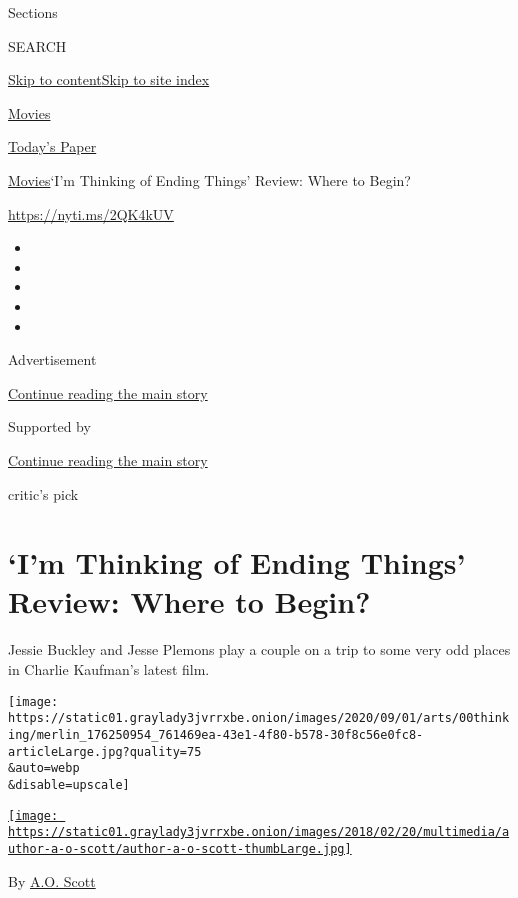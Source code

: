Sections

SEARCH

\protect\hyperlink{site-content}{Skip to
content}\protect\hyperlink{site-index}{Skip to site index}

\href{https://www.nytimes3xbfgragh.onion/section/movies}{Movies}

\href{https://myaccount.nytimes3xbfgragh.onion/auth/login?response_type=cookie\&client_id=vi}{}

\href{https://www.nytimes3xbfgragh.onion/section/todayspaper}{Today's
Paper}

\href{/section/movies}{Movies}\textbar{}`I'm Thinking of Ending Things'
Review: Where to Begin?

\url{https://nyti.ms/2QK4kUV}

\begin{itemize}
\item
\item
\item
\item
\item
\end{itemize}

Advertisement

\protect\hyperlink{after-top}{Continue reading the main story}

Supported by

\protect\hyperlink{after-sponsor}{Continue reading the main story}

critic's pick

\hypertarget{im-thinking-of-ending-things-review-where-to-begin}{%
\section{`I'm Thinking of Ending Things' Review: Where to
Begin?}\label{im-thinking-of-ending-things-review-where-to-begin}}

Jessie Buckley and Jesse Plemons play a couple on a trip to some very
odd places in Charlie Kaufman's latest film.

\texttt{[image: https://static01.graylady3jvrrxbe.onion/images/2020/09/01/arts/00thinking/merlin\_176250954\_761469ea-43e1-4f80-b578-30f8c56e0fc8-articleLarge.jpg?quality=75\\\&auto=webp\\\&disable=upscale]}

\href{https://www.nytimes3xbfgragh.onion/by/a-o--scott}{\texttt{[image: https://static01.graylady3jvrrxbe.onion/images/2018/02/20/multimedia/author-a-o-scott/author-a-o-scott-thumbLarge.jpg]}}

By \href{https://www.nytimes3xbfgragh.onion/by/a-o--scott}{A.O. Scott}

